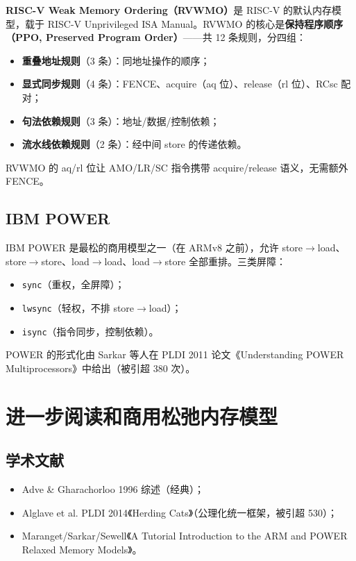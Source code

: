 \textbf{RISC-V Weak Memory Ordering（RVWMO）}是 RISC-V 的默认内存模型，载于 RISC-V Unprivileged ISA Manual。RVWMO 的核心是\textbf{保持程序顺序（PPO, Preserved Program Order）}——共 12 条规则，分四组：

\begin{itemize}
\item \textbf{重叠地址规则}（3 条）：同地址操作的顺序；
\item \textbf{显式同步规则}（4 条）：FENCE、acquire（aq 位）、release（rl 位）、RCsc 配对；
\item \textbf{句法依赖规则}（3 条）：地址/数据/控制依赖；
\item \textbf{流水线依赖规则}（2 条）：经中间 store 的传递依赖。
\end{itemize}


RVWMO 的 aq/rl 位让 AMO/LR/SC 指令携带 acquire/release 语义，无需额外 FENCE。

\subsection{IBM POWER}

IBM POWER 是最松的商用模型之一（在 ARMv8 之前），允许 store$\rightarrow$load、store$\rightarrow$store、load$\rightarrow$load、load$\rightarrow$store 全部重排。三类屏障：

\begin{itemize}
\item \texttt{sync}（重权，全屏障）；
\item \texttt{lwsync}（轻权，不排 store$\rightarrow$load）；
\item \texttt{isync}（指令同步，控制依赖）。
\end{itemize}


POWER 的形式化由 Sarkar 等人在 PLDI 2011 论文《Understanding POWER Multiprocessors》中给出（被引超 380 次）。

\section{进一步阅读和商用松弛内存模型}

\subsection{学术文献}

\begin{itemize}
\item Adve \& Gharachorloo 1996 综述（经典）；
\item Alglave et al. PLDI 2014《Herding Cats》（公理化统一框架，被引超 530）；
\item Maranget/Sarkar/Sewell《A Tutorial Introduction to the ARM and POWER Relaxed Memory Models》。
\end{itemize}


